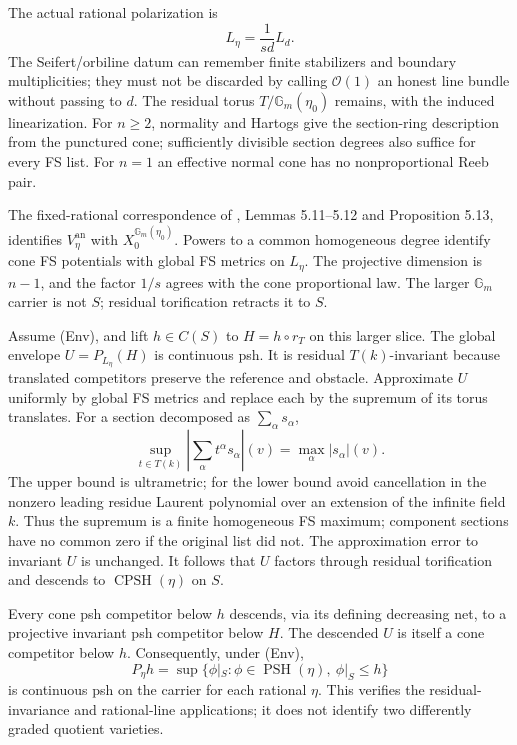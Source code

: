 \documentclass[11pt]{article}
\newcommand{\CPSH}{\operatorname{CPSH}}
\newcommand{\PSH}{\operatorname{PSH}}
\newcommand{\an}{\mathrm{an}}
\begin{document}
The actual rational polarization is
\[
 L_\eta=\frac{1}{sd}L_d.
\]
The Seifert/orbiline datum can remember finite stabilizers and boundary multiplicities; they must not be discarded by calling $\mathcal O(1)$ an honest line bundle without passing to $d$.
The residual torus $T/\mathbb G_m(\eta_0)$ remains, with the induced linearization.
For $n\geq2$, normality and Hartogs give the section-ring description from the punctured cone; sufficiently divisible section degrees also suffice for every FS list.
For $n=1$ an effective normal cone has no nonproportional Reeb pair.

The fixed-rational correspondence of \cite{YW22}, Lemmas 5.11--5.12 and Proposition 5.13, identifies $V_\eta^\an$ with $X_0^{\mathbb G_m(\eta_0)}$.
Powers to a common homogeneous degree identify cone FS potentials with global FS metrics on $L_\eta$.
The projective dimension is $n-1$, and the factor $1/s$ agrees with the cone proportional law.
The larger $\mathbb G_m$ carrier is not $S$; residual torification retracts it to $S$.

Assume (Env), and lift $h\in C(S)$ to $H=h\circ r_T$ on this larger slice.
The global envelope $U=P_{L_\eta}(H)$ is continuous psh.
It is residual $T(k)$-invariant because translated competitors preserve the reference and obstacle.
Approximate $U$ uniformly by global FS metrics and replace each by the supremum of its torus translates.
For a section decomposed as $\sum_\alpha s_\alpha$,
\[
 \sup_{t\in T(k)}\left|\sum_\alpha t^\alpha s_\alpha\right|(v)
 =\max_\alpha|s_\alpha|(v).
\]
The upper bound is ultrametric; for the lower bound avoid cancellation in the nonzero leading residue Laurent polynomial over an extension of the infinite field $k$.
Thus the supremum is a finite homogeneous FS maximum; component sections have no common zero if the original list did not.
The approximation error to invariant $U$ is unchanged.
It follows that $U$ factors through residual torification and descends to $\CPSH(\eta)$ on $S$.

Every cone psh competitor below $h$ descends, via its defining decreasing net, to a projective invariant psh competitor below $H$.
The descended $U$ is itself a cone competitor below $h$.
Consequently, under (Env),
\[
 P_\eta h=\sup\{\phi|_S:\phi\in\PSH(\eta),\ \phi|_S\leq h\}
\]
is continuous psh on the carrier for each rational $\eta$.
This verifies the residual-invariance and rational-line applications; it does not identify two differently graded quotient varieties.
\end{document}
